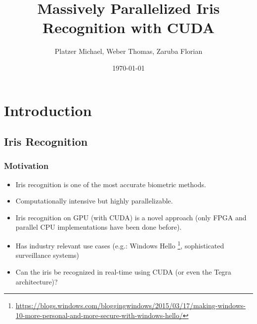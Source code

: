 \documentclass{beamer}
\begin{document}
\title[Massively Parallelized Iris Recognition with CUDA]{Massively Parallelized Iris Recognition with CUDA}
\author[Platzer M., Weber T., Zaruba F.]{Platzer Michael, Weber Thomas, Zaruba Florian}
\date{\today}
\begin{frame}
    \titlepage
\end{frame}

\section{Introduction}
\subsection{Iris Recognition}
\begin{frame}\frametitle{Motivation}
    \begin{itemize}
        \item Iris recognition is one of the most accurate biometric methods.
        \item Computationally intensive but highly parallelizable.
        \item Iris recognition on GPU (with CUDA) is a novel approach (only FPGA and parallel CPU implementations have been done before).
        \item Has industry relevant use cases (e.g.: Windows Hello \footnote{\url{https://blogs.windows.com/bloggingwindows/2015/03/17/making-windows-10-more-personal-and-more-secure-with-windows-hello/}}, sophisticated surveillance systems)
        \item Can the iris be recognized in real-time using CUDA (or even the Tegra architecture)?
    \end{itemize}
\end{frame}
\end{document}
